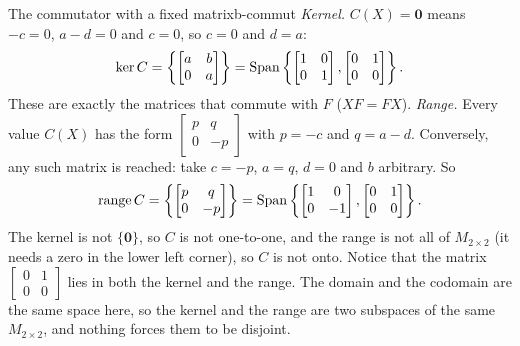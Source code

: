 \documentclass[11pt]{article}
\begin{document}
\begin{exmp}{The commutator with a fixed matrix}{b-commut}
\emph{Kernel.} $C(X)=\mathbf{0}$ means $-c=0$, $a-d=0$ and $c=0$, so $c=0$ and $d=a$:
\[
\ker C=\left\{\begin{bmatrix}a&b\\0&a\end{bmatrix}\right\}=\operatorname{Span}\left\{\begin{bmatrix}1&0\\0&1\end{bmatrix},\begin{bmatrix}0&1\\0&0\end{bmatrix}\right\}.
\]
These are exactly the matrices that commute with $F$ ($XF=FX$). \emph{Range.} Every value $C(X)$ has the form $\begin{bmatrix}p&q\\0&-p\end{bmatrix}$ with $p=-c$ and $q=a-d$. Conversely, any such matrix is reached: take $c=-p$, $a=q$, $d=0$ and $b$ arbitrary. So
\[
\operatorname{range}C=\left\{\begin{bmatrix}p&q\\0&-p\end{bmatrix}\right\}=\operatorname{Span}\left\{\begin{bmatrix}1&0\\0&-1\end{bmatrix},\begin{bmatrix}0&1\\0&0\end{bmatrix}\right\}.
\]
The kernel is not $\{\mathbf{0}\}$, so $C$ is not one-to-one, and the range is not all of $M_{2\times2}$ (it needs a zero in the lower left corner), so $C$ is not onto. Notice that the matrix $\begin{bmatrix}0&1\\0&0\end{bmatrix}$ lies in both the kernel and the range. The domain and the codomain are the same space here, so the kernel and the range are two subspaces of the same $M_{2\times2}$, and nothing forces them to be disjoint.
\end{exmp}
\end{document}
